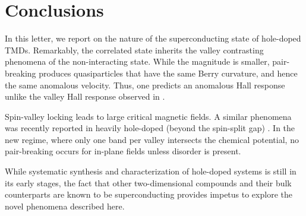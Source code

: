 \section{Conclusions}

In this letter, we report on the nature of the superconducting state
of hole-doped TMDs.
Remarkably, the correlated state inherits
the valley contrasting phenomena of the non-interacting state.
While the magnitude is smaller, pair-breaking produces quasiparticles
that have the same Berry curvature, and hence the same anomalous velocity.
Thus, one predicts an anomalous Hall response unlike the valley Hall response
observed in .

Spin-valley locking leads to large critical magnetic fields.
A similar phenomena was recently reported in heavily hole-doped
(beyond the spin-split gap) 
\cite{%
  1510.06289v2,%
  PhysRevLett.113.097001%
}.
In the new regime, where only one band per valley intersects
the chemical potential, no pair-breaking occurs
for in-plane fields unless disorder is present.

While systematic synthesis and characterization of hole-doped systems
is still in its early stages, the fact that other two-dimensional compounds
and their bulk counterparts are known to be superconducting
\cite{%
  PhysRevB.88.054515%
}
provides impetus to explore the novel phenomena described here.
